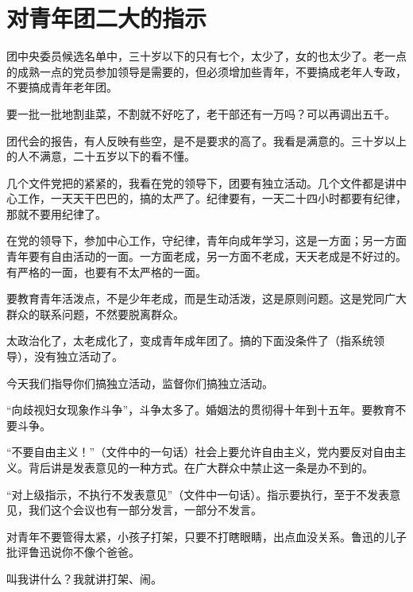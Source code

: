 \section[对青年团二大的指示（一九五三年六月）]{对青年团二大的指示}


团中央委员候选名单中，三十岁以下的只有七个，太少了，女的也太少了。老一点的成熟一点的党员参加领导是需要的，但必须增加些青年，不要搞成老年人专政，不要搞成青年老年团。

要一批一批地割韭菜，不割就不好吃了，老干部还有一万吗？可以再调出五千。

团代会的报告，有人反映有些空，是不是要求的高了。我看是满意的。三十岁以上的人不满意，二十五岁以下的看不懂。

几个文件党把的紧紧的，我看在党的领导下，团要有独立活动。几个文件都是讲中心工作，一天天干巴巴的，搞的太严了。纪律要有，一天二十四小时都要有纪律，那就不要用纪律了。

在党的领导下，参加中心工作，守纪律，青年向成年学习，这是一方面；另一方面青年要有自由活动的一面。一方面老成，另一方面不老成，天天老成是不好过的。有严格的一面，也要有不太严格的一面。

要教育青年活泼点，不是少年老成，而是生动活泼，这是原则问题。这是党同广大群众的联系问题，不然要脱离群众。

太政治化了，太老成化了，变成青年成年团了。搞的下面没条件了（指系统领导），没有独立活动了。

今天我们指导你们搞独立活动，监督你们搞独立活动。

“向歧视妇女现象作斗争”，斗争太多了。婚姻法的贯彻得十年到十五年。要教育不要斗争。

“不要自由主义！”（文件中的一句话）社会上要允许自由主义，党内要反对自由主义。背后讲是发表意见的一种方式。在广大群众中禁止这一条是办不到的。

“对上级指示，不执行不发表意见”（文件中一句话）。指示要执行，至于不发表意见，我们这个会议也有一部分发言，一部分不发言。

对青年不要管得太紧，小孩子打架，只要不打瞎眼睛，出点血没关系。鲁迅的儿子批评鲁迅说你不像个爸爸。

叫我讲什么？我就讲打架、闹。


